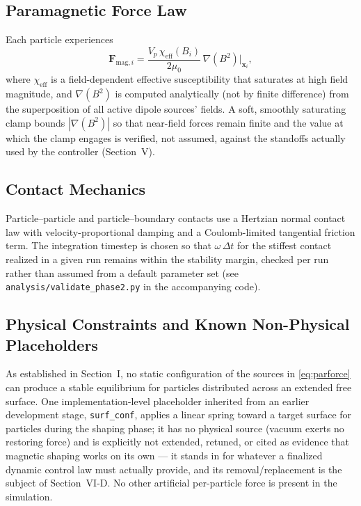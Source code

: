 \documentclass[journal]{IEEEtran}
\begin{document}
\subsection{Paramagnetic Force Law}
Each particle experiences
\begin{equation}
\mathbf{F}_{\mathrm{mag},i} = \frac{V_p\,\chi_{\mathrm{eff}}(B_i)}{2\mu_0}\,
\nabla\!\left(B^2\right)\Big|_{\mathbf{x}_i},
\label{eq:parforce}
\end{equation}
where $\chi_{\mathrm{eff}}$ is a field-dependent effective susceptibility
that saturates at high field magnitude, and $\nabla(B^2)$ is computed
analytically (not by finite difference) from the superposition of all
active dipole sources' fields. A soft, smoothly saturating clamp bounds
$|\nabla(B^2)|$ so that near-field forces remain finite and the value at
which the clamp engages is verified, not assumed, against the standoffs
actually used by the controller (Section~V).

\subsection{Contact Mechanics}
Particle--particle and particle--boundary contacts use a Hertzian normal
contact law with velocity-proportional damping and a Coulomb-limited
tangential friction term. The integration timestep is chosen so that
$\omega\,\Delta t$ for the stiffest contact realized in a given run remains
within the stability margin, checked per run rather than assumed from a
default parameter set (see \texttt{analysis/validate\_phase2.py} in the
accompanying code).

\subsection{Physical Constraints and Known Non-Physical Placeholders}
As established in Section~I, no static configuration of the sources in
\eqref{eq:parforce} can produce a stable equilibrium for particles
distributed across an extended free surface. One implementation-level
placeholder inherited from an earlier development stage,
\texttt{surf\_conf}, applies a linear spring toward a target surface for
particles during the shaping phase; it has no physical source (vacuum
exerts no restoring force) and is explicitly not extended, retuned, or
cited as evidence that magnetic shaping works on its own --- it stands in
for whatever a finalized dynamic control law must actually provide, and its
removal/replacement is the subject of Section~VI-D. No other artificial
per-particle force is present in the simulation.
\end{document}
